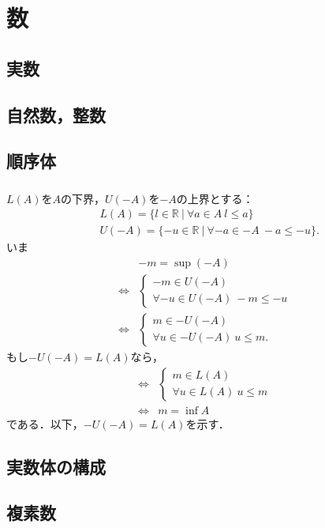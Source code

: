 
\section{数}

\subsection{実数}
\subsection{自然数，整数}
\subsection{順序体}
\subsubsection{}
\subsubsection{}
\begin{ans}
    $L(A)$を$A$の下界，$U(-A)$を$-A$の上界とする：
    \begin{align*}
        & L(A) = \{ l \in \mathbb{R} ~ | ~ \forall a \in A ~ l \leq a \}\\
        & U(-A) = \{ -u \in \mathbb{R} ~ | ~ \forall -a \in -A ~ -a \leq -u \}.
    \end{align*}
    いま
    \begin{align*}
        & -m = \sup (-A)\\
        \Leftrightarrow & \begin{cases}
            -m \in U(-A)\\
            \forall -u \in U(-A) ~ -m \leq -u
        \end{cases}\\
        \Leftrightarrow & \begin{cases}
            m \in -U(-A)\\
            \forall u \in -U(-A) ~ u \leq m.
        \end{cases}
    \end{align*}
    もし$-U(-A) = L(A)$なら，
    \begin{align*}
        \Leftrightarrow & \begin{cases}
            m \in L(A)\\
            \forall u \in L(A) ~ u \leq m
        \end{cases}\\
        \Leftrightarrow & m = \inf A
    \end{align*}
    である．以下，$-U(-A) = L(A)$を示す．
\end{ans}


\subsection{実数体の構成}
\subsection{複素数}
